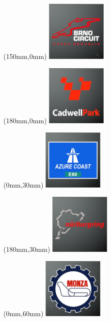 \begin{textblock*}{30mm}(150mm,0mm)%
\includegraphics[width=30mm]{LG/2015-05-20_00075.png}
\end{textblock*}
\begin{textblock*}{30mm}(180mm,0mm)%
\includegraphics[width=30mm]{LG/2015-05-20_00076.png}
\end{textblock*}
\begin{textblock*}{30mm}(0mm,30mm)%
\includegraphics[width=30mm]{LG/2015-05-20_00073.png}
\end{textblock*}
\begin{textblock*}{30mm}(180mm,30mm)%
\includegraphics[width=30mm]{LG/2015-05-20_00089.png}
\end{textblock*}
\begin{textblock*}{30mm}(0mm,60mm)%
\includegraphics[width=30mm]{LG/2015-05-20_00086.png}
\end{textblock*}
